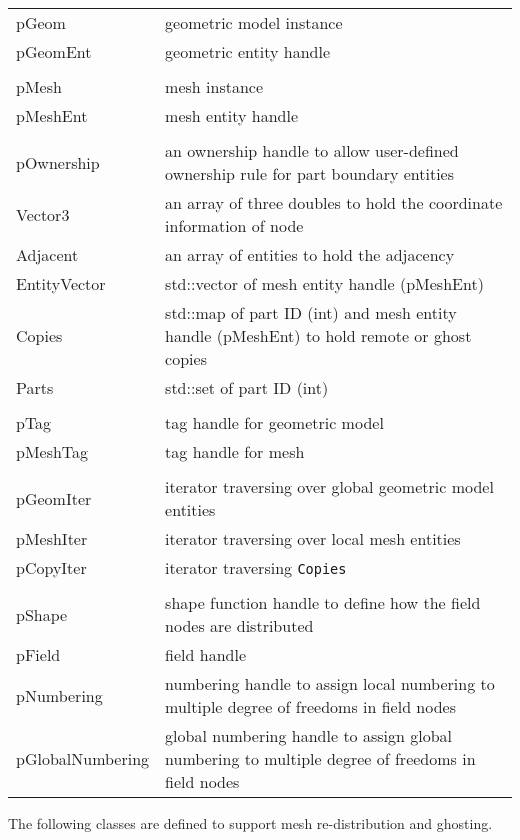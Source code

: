 \begin{tabular}{lp{14cm}}	
	pGeom &		geometric model instance \\
	pGeomEnt &	geometric entity handle \\
	&\\
	pMesh &		mesh instance\\
	pMeshEnt &	mesh entity handle\\
        &\\
        pOwnership &    an ownership handle to allow user-defined ownership rule for part boundary entities\\
        Vector3 & 	an array of three doubles to hold the coordinate information of node\\
        Adjacent & 	an array of entities to hold the adjacency\\
        EntityVector  &    std::vector of mesh entity handle (pMeshEnt) \\
        Copies &          std::map of part ID (int) and mesh entity handle (pMeshEnt) to hold remote or ghost copies \\
        Parts  &          std::set of part ID (int) \\
	&\\
        pTag &          tag handle for geometric model\\
        pMeshTag &      tag handle for mesh\\
        &\\
	pGeomIter &		iterator traversing over global geometric model entities \\
        pMeshIter &          iterator traversing over local mesh entities\\
        pCopyIter &       iterator traversing \texttt{Copies} \\
        &\\
	pShape &	     shape function handle to define how the field nodes are distributed \\
        pField &             field handle\\
        pNumbering & numbering handle to assign local numbering to multiple degree of freedoms in field nodes \\
        pGlobalNumbering &   global numbering handle to assign global numbering to multiple degree of freedoms in field nodes\\
\end{tabular}	

The following classes are defined to support mesh re-distribution and ghosting.

